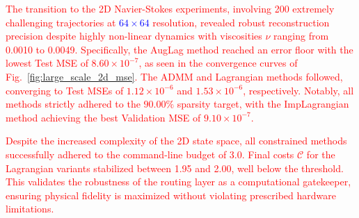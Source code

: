 \documentclass[preprint,12pt,authoryear]{elsarticle}
\begin{document}
\textcolor{red}{The transition to the 2D Navier-Stokes experiments, involving 200 extremely challenging trajectories at \textcolor{blue}{$64 \times 64$} resolution, revealed robust reconstruction precision despite highly non-linear dynamics with viscosities $\nu$ ranging from 0.0010 to 0.0049. Specifically, the AugLag method reached an error floor with the lowest Test MSE of $8.60 \times 10^{-7}$, as seen in the convergence curves of Fig.~\ref{fig:large_scale_2d_mse}. The ADMM and Lagrangian methods followed, converging to Test MSEs of $1.12 \times 10^{-6}$ and $1.53 \times 10^{-6}$, respectively. Notably, all methods strictly adhered to the $90.00\%$ sparsity target, with the ImpLagrangian method achieving the best Validation MSE of $9.10 \times 10^{-7}$.}

\textcolor{red}{ Despite the increased complexity of the 2D state space, all constrained methods successfully adhered to the command-line budget of 3.0. Final costs $\mathcal{C}$ for the Lagrangian variants stabilized between 1.95 and 2.00, well below the threshold. This validates the robustness of the routing layer as a computational gatekeeper, ensuring physical fidelity is maximized without violating prescribed hardware limitations.}
\end{document}
